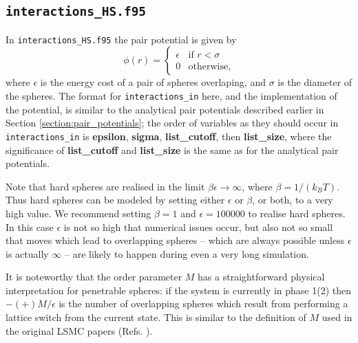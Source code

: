 \documentclass{report}
\begin{document}
\subsection{\texttt{interactions\_HS.f95}}
In \texttt{interactions\_HS.f95} the pair potential is given by
\begin{equation}
\phi(r)=
\begin{cases} 
\epsilon & \text{if }r<\sigma \\
0 & \text{otherwise},
\end{cases}
\end{equation}
where $\epsilon$ is the energy cost of a pair of spheres overlaping, and $\sigma$ is the diameter of the spheres.
The format for \texttt{interactions\_in} here, and the implementation of the potential, is similar to the analytical pair potentials 
described earlier in Section \ref{section:pair_potentials}; the order of variables as they should occur in \texttt{interactions\_in} 
is \textbf{epsilon}, \textbf{sigma}, \textbf{list\_cutoff}, then \textbf{list\_size}, where the significance of 
\textbf{list\_cutoff} and \textbf{list\_size} is the same as for the analytical pair potentials.

Note that hard spheres are realised in the limit $\beta\epsilon\to\infty$, where $\beta=1/(k_BT)$. Thus hard spheres can be modeled by 
setting either $\epsilon$ or $\beta$, or both, to a very high value. We recommend setting $\beta=1$ and $\epsilon=100000$ to realise
hard spheres. In this case $\epsilon$ is not so high that numerical issues occur,
but also not so small that moves which lead to overlapping spheres -- which are always possible unless $\epsilon$ is actually
$\infty$ -- are likely to happen during even a very long simulation.

It is noteworthy that the order parameter $M$ has a straightforward physical interpretation for penetrable spheres: if the system is
currently in phase 1(2) then $-(+)M/\epsilon$ is the number of overlapping spheres which result from performing a lattice switch from the 
current state. This is similar to the definition of $M$ used in the original LSMC papers (Refs. \cite{Bruce_1997,Bruce_2000}).
\end{document}
